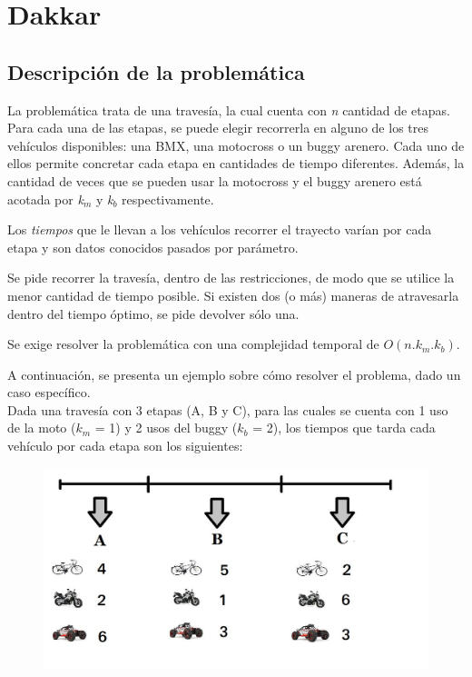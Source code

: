 \section{Dakkar}
\subsection{Descripci\'on de la problem\'atica}
La problem\'atica trata de una traves\'ia, la cual cuenta con \emph{n} cantidad de etapas. Para cada una de las etapas, se puede elegir recorrerla en alguno de los tres veh\'iculos disponibles: una BMX, una motocross o un buggy arenero. Cada uno de ellos permite concretar cada etapa en cantidades de tiempo diferentes.
Adem\'as, la cantidad de veces que se pueden usar la motocross y el buggy arenero est\'a acotada por \emph{k}$_m$ y \emph{k}$_b$ respectivamente.

Los \emph{tiempos} que le llevan a los veh\'iculos recorrer el trayecto var\'ian por cada etapa y son datos conocidos pasados por par\'ametro.

Se pide recorrer la traves\'ia, dentro de las restricciones, de modo que se utilice la menor cantidad de tiempo posible. Si existen dos (o m\'as) maneras de atravesarla dentro del tiempo
\'optimo, se pide devolver s\'olo una.

Se exige resolver la problem\'atica con una complejidad temporal de $O(n.k_m.k_b)$.\\

\bigskip

A continuaci\'on, se presenta un ejemplo sobre c\'omo resolver el problema, dado un caso espec\'ifico.\\

Dada una traves\'ia con 3 etapas (A, B y C), para las cuales se cuenta con 1 uso de la moto ($k_m$ = 1) y 2 usos del buggy ($k_b$ = 2), los tiempos que tarda cada veh\'iculo por cada etapa son los siguientes: \\

  \begin{figure}[h!]
   \begin{center}
 	\includegraphics[scale=0.4]{imagenes/ej1/ejemplo.png}
   \end{center}
 \end{figure}



